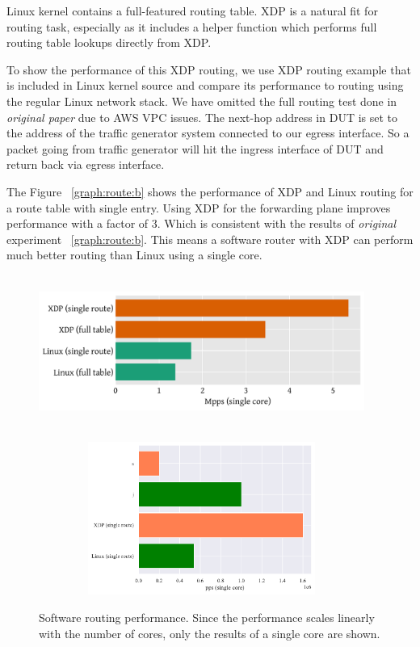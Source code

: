 \documentclass[12pt,titlepage]{article}
\begin{document}
Linux kernel contains  a full-featured routing table. XDP is a natural fit for routing task, especially as it includes a helper function which performs full routing table lookups directly from XDP.

To show the performance of this XDP routing, we use XDP routing example that is included in Linux kernel source \cite{fwd-example} and compare its performance to routing using the regular Linux network stack.
We have omitted the full routing test done in  \textit{original paper} due to AWS VPC issues. The next-hop address in DUT is set to the address of the traffic generator system connected to our egress interface. So a packet going from traffic generator will hit the ingress interface of DUT and return back via egress interface. 

The Figure ~\ref{graph:route:b} shows the performance of XDP and Linux routing for a route table with single entry. Using XDP for the forwarding plane improves performance with a factor of 3. Which is consistent with the results of \textit{original} experiment ~\ref{graph:route:b}. This means a software router with XDP can perform much better routing than Linux using a single core.

\begin{figure}
    \centering
    \begin{minipage}{0.7\textwidth}
        \centering
        \includegraphics[width=0.95\textwidth,height=5cm]{original/router-fwd.pdf} %
        \label{graph:route:a}
    \end{minipage}\hfill
    
    \begin{minipage}{0.7\textwidth}
        \centering
        \includegraphics[width=0.95\textwidth,height=5cm]{img/router-fwd.pdf} %
        \label{graph:route:b}
    \end{minipage}
     \caption{Software routing performance. Since the performance scales linearly with the number of cores, only the results of a single core are shown.}
     \label{graph:route}
\end{figure}
\end{document}
